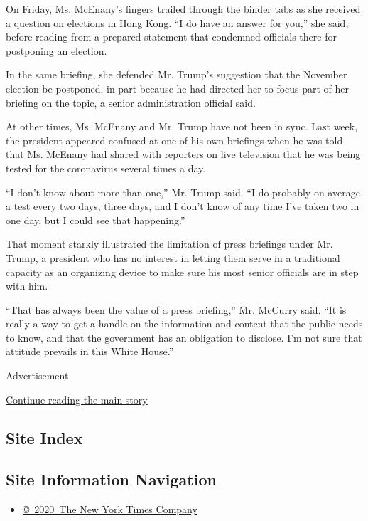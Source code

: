 On Friday, Ms. McEnany's fingers trailed through the binder tabs as she
received a question on elections in Hong Kong. ``I do have an answer for
you,'' she said, before reading from a prepared statement that condemned
officials there for
\href{https://www.nytimes.com/2020/07/31/world/asia/hong-kong-election-delayed.html}{postponing
an election}.

In the same briefing, she defended Mr. Trump's suggestion that the
November election be postponed, in part because he had directed her to
focus part of her briefing on the topic, a senior administration
official said.

At other times, Ms. McEnany and Mr. Trump have not been in sync. Last
week, the president appeared confused at one of his own briefings when
he was told that Ms. McEnany had shared with reporters on live
television that he was being tested for the coronavirus several times a
day.

``I don't know about more than one,'' Mr. Trump said. ``I do probably on
average a test every two days, three days, and I don't know of any time
I've taken two in one day, but I could see that happening.''

That moment starkly illustrated the limitation of press briefings under
Mr. Trump, a president who has no interest in letting them serve in a
traditional capacity as an organizing device to make sure his most
senior officials are in step with him.

``That has always been the value of a press briefing,'' Mr. McCurry
said. ``It is really a way to get a handle on the information and
content that the public needs to know, and that the government has an
obligation to disclose. I'm not sure that attitude prevails in this
White House.''

Advertisement

\protect\hyperlink{after-bottom}{Continue reading the main story}

\hypertarget{site-index}{%
\subsection{Site Index}\label{site-index}}

\hypertarget{site-information-navigation}{%
\subsection{Site Information
Navigation}\label{site-information-navigation}}

\begin{itemize}
\tightlist
\item
  \href{https://help.nytimes.com/hc/en-us/articles/115014792127-Copyright-notice}{©~2020~The
  New York Times Company}
\end{itemize}

